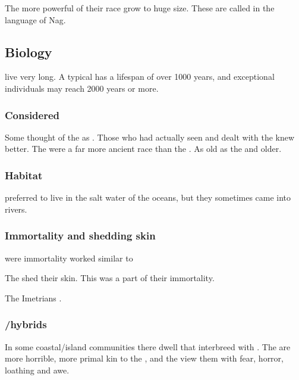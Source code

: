The more powerful of their race grow to huge size.
These \nagalords{} are called \nagalords{} in the language of Nag.









\subsection{Biology}
\Nagae{} live very long. A typical \naga{} has a lifespan of over 1000 years, and exceptional individuals may reach 2000 years or more. 





\subsubsection{Considered \demiscathae}
Some thought of the \nagae as .
Those who had actually seen and dealt with the \nagae knew better.
The \nagae were a far more ancient race than the \scathae. 
As old as the \dragons and older. 





\subsubsection{Habitat}
\Nagae preferred to live in the salt water of the oceans, but they sometimes came into rivers. 





\subsubsection{Immortality and shedding skin}
\Nagae were 
\Naga immortality worked similar to 

The \nagae shed their skin.
This was a part of their immortality. 

The Imetrians . 





\subsubsection[Scatha/Naga hybrids]{\Scatha/\naga hybrids}
In some coastal/island communities there dwell \scathae{} that interbreed with \nagae{}. The \nagae{} are more horrible, more primal kin to the \scathae, and the \scathae{} view them with fear, horror, loathing and awe. 

